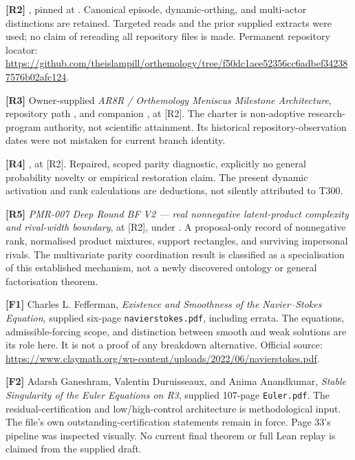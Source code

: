 \documentclass[11pt,a4paper]{article}
\begin{document}
\textbf{{[}R2{]}} , pinned at
. Canonical episode,
dynamic-orthing, and multi-actor distinctions are retained. Targeted
reads and the prior supplied extracts were used; no claim of rereading
all repository files is made. Permanent repository locator:
\url{https://github.com/theislampill/orthemology/tree/f50dc1aee52356cc6adbef342387576b02afc124}.

\textbf{{[}R3{]}} Owner-supplied \emph{AR8R / Orthemology Meniscus
Milestone Architecture}, repository path
,
and companion , at
{[}R2{]}. The charter is non-adoptive research-program authority, not
scientific attainment. Its historical repository-observation dates were
not mistaken for current branch identity.

\textbf{{[}R4{]}}
,
at {[}R2{]}. Repaired, scoped parity diagnostic, explicitly no general
probability novelty or empirical restoration claim. The present dynamic
activation and rank calculations are deductions, not silently attributed
to T300.

\textbf{{[}R5{]}} \emph{PMR-007 Deep Round BF V2 --- real nonnegative
latent-product complexity and rival-width boundary}, at {[}R2{]}, under
.
A proposal-only record of nonnegative rank, normalised product mixtures,
support rectangles, and surviving impersonal rivals. The multivariate
parity coordination result is classified as a specialisation of this
established mechanism, not a newly discovered ontology or general
factorisation theorem.

\textbf{{[}F1{]}} Charles L. Fefferman, \emph{Existence and Smoothness
of the Navier--Stokes Equation}, supplied six-page
\texttt{navierstokes.pdf}, including errata. The equations,
admissible-forcing scope, and distinction between smooth and weak
solutions are its role here. It is not a proof of any breakdown
alternative. Official source:
\url{https://www.claymath.org/wp-content/uploads/2022/06/navierstokes.pdf}.

\textbf{{[}F2{]}} Adarsh Ganeshram, Valentin Duruisseaux, and Anima
Anandkumar, \emph{Stable Singularity of the Euler Equations on R3},
supplied 107-page \texttt{Euler.pdf}. The residual-certification and
low/high-control architecture is methodological input. The file's own
outstanding-certification statements remain in force. Page 33's pipeline
was inspected visually. No current final theorem or full Lean replay is
claimed from the supplied draft.
\end{document}
